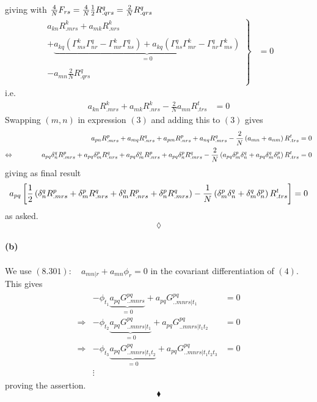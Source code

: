 giving with $\frac{4}{N}F_{rs} = \frac{4}{N}\frac{1}{2} R^q_{.qrs}=\frac{2}{N} R^q_{.qrs}$
\begin{align*}
\left.\begin{matrix}
a_{kn}R^k_{.mrs}+ a_{mk}R^k_{.nrs}\\\\
+ \underbrace{a_{kq}\left(\Gamma^k_{ms}\Gamma^q_{nr}  -\Gamma^k_{mr} \Gamma^q_{ns}\right) 
+ a_{kq}\left(\Gamma^q_{ns}\Gamma^k_{mr}- \Gamma^q_{nr}\Gamma^k_{ms}\right) }_{=0}\\\\
-a_{mn}\frac{2}{N}R^q_{.qrs}\\
\end{matrix}\right\}&=0
\end{align*}
i.e.
\begin{align}
a_{kn}R^k_{.mrs}+ a_{mk}R^k_{.nrs}-\frac{2}{N}a_{mn}R^t_{.trs}&=0
\end{align} 
Swapping $(m,n)$ in expression $(3)$ and adding this to $(3)$ gives
\begin{align*}
a_{pn}R^p_{.mrs}+ a_{mq}R^q_{.nrs}+a_{pm}R^p_{.nrs}+ a_{nq}R^q_{.mrs}-\frac{2}{N}\left(a_{mn}+a_{nm}\right)R^t_{.trs}&=0\\
\Leftrightarrow\quad\quad\quad\quad a_{pq}\delta^q_n R^p_{.mrs}+ a_{pq}\delta^p_mR^q_{.nrs}+a_{pq}\delta^q_mR^p_{.nrs}+ a_{pq}\delta^p_nR^q_{.mrs}-\frac{2}{N}\left(a_{pq}\delta^p_m\delta^q_n+a_{pq}\delta^q_m\delta^p_n\right)R^t_{.trs}&=0
\end{align*}
giving as final result
\begin{align}a_{pq}\left[\frac{1}{2}\left(\delta^q_n R^p_{.mrs}+\delta^p_mR^q_{.nrs}+\delta^q_mR^p_{.nrs}+\delta^p_nR^q_{.mrs}\right)-\frac{1}{N}\left(\delta^p_m\delta^q_n+\delta^q_m\delta^p_n\right)R^t_{.trs}\right]=0
\end{align}
as asked.\\

$$\lozenge$$\\
\textbf{(b)}\\\\
We use $\mathbf{(8.301)}:  \quad a_{mn|r}+ a_{mn}\phi_r=0$ in the  
covariant differentiation of $(4)$. \\
This  gives
\begin{align*}
\begin{matrix}
&-\phi_{t_1}\underbrace{a_{pq}G^{pq}_{..mnrs}}_{=0}
+a_{pq}G^{pq}_{..mnrs|t_1}&=0\\
\Rightarrow& -\phi_{t_2}\underbrace{a_{pq}G^{pq}_{..mnrs|t_1}}_{=0}
+a_{pq}G^{pq}_{..mnrs|t_1t_2}&=0\\
\Rightarrow& -\phi_{t_3}\underbrace{a_{pq}G^{pq}_{..mnrs|t_1 t_2}}_{=0}
+a_{pq}G^{pq}_{..mnrs|t_1t_2t_3}&=0\\
&\vdots&
\end{matrix}
\end{align*}
proving the assertion.
$$\blacklozenge$$
\newpage





